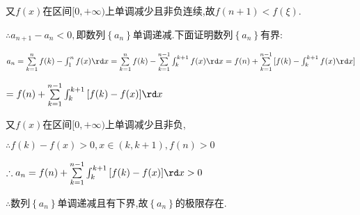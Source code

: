 又$f(x)$在区间$[0, + \infty )$上单调减少且非负连续,故$f(n + 1) < f(\xi ).$

$\therefore {a_{n + 1}} - {a_n} < 0,$即数列$\left\{ {{a_n}} \right\}$单调递减.下面证明数列$\left\{ {{a_n}} \right\}$有界:

${a_n} = \sum\limits_{k = 1}^n {f(k)}  - \int_1^n {f(x)\rd x}  = \sum\limits_{k = 1}^n {f(k)}  - \sum\limits_{k = 1}^{n - 1} {\int_k^{k + 1} {f(x)\rd x} }  = f(n) + \sum\limits_{k = 1}^{n - 1} {[f(k) - \int_k^{k + 1} {f(x)\rd x} ]} $

$ = f(n) + \sum\limits_{k = 1}^{n - 1} {\int_k^{k + 1} {[f(k) - f(x)]\rd x} } $

又$f(x)$在区间$[0, + \infty )$上单调减少且非负,

$\therefore f(k) - f(x) > 0,x \in (k,k + 1),f(n) > 0$

$\therefore {a_n} = f(n) + \sum\limits_{k = 1}^{n - 1} {\int_k^{k + 1} {[f(k) - f(x)]\rd x} }  > 0$

$\therefore$数列$\left\{ {{a_n}} \right\}$单调递减且有下界,故$\left\{ {{a_n}} \right\}$的极限存在.






































